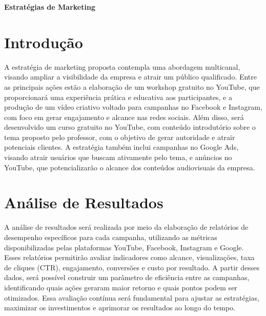 \documentclass[11pt, a4paper]{article}
\newcommand{\documenttitle}[1]{%
    \vspace*{1.5cm} %
    \begin{center}
        \textsf{\color{corporateblue}\bfseries\Huge #1}
    \end{center}
    \vspace*{1cm} %
}
\begin{document}
\documenttitle{Estratégias de Marketing}

\section*{Introdução} %
\textsf{\color{corporategray} A estratégia de marketing proposta contempla uma abordagem multicanal, visando ampliar a visibilidade da empresa e atrair um público qualificado. Entre as principais ações estão a elaboração de um workshop gratuito no YouTube, que proporcionará uma experiência prática e educativa aos participantes, e a produção de um vídeo criativo voltado para campanhas no Facebook e Instagram, com foco em gerar engajamento e alcance nas redes sociais. Além disso, será desenvolvido um curso gratuito no YouTube, com conteúdo introdutório sobre o tema proposto pelo professor, com o objetivo de gerar autoridade e atrair potenciais clientes. A estratégia também inclui campanhas no Google Ads, visando atrair usuários que buscam ativamente pelo tema, e anúncios no YouTube, que potencializarão o alcance dos conteúdos audiovisuais da empresa.} %

\vspace{0.5cm} %

\section*{Análise de Resultados}
\textsf{\color{corporategray} A análise de resultados será realizada por meio da elaboração de relatórios de desempenho específicos para cada campanha, utilizando as métricas disponibilizadas pelas plataformas YouTube, Facebook, Instagram e Google. Esses relatórios permitirão avaliar indicadores como alcance, visualizações, taxa de cliques (CTR), engajamento, conversões e custo por resultado. A partir desses dados, será possível construir um parâmetro de eficiência entre as campanhas, identificando quais ações geraram maior retorno e quais pontos podem ser otimizados. Essa avaliação contínua será fundamental para ajustar as estratégias, maximizar os investimentos e aprimorar os resultados ao longo do tempo.} %
\end{document}
